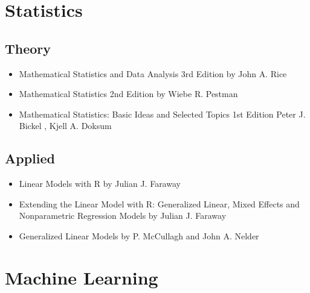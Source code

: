 \documentclass[
  11pt,
]{book}
\providecommand{\tightlist}{%
  \setlength{\itemsep}{0pt}\setlength{\parskip}{0pt}}
\begin{document}
\hypertarget{statistics}{%
\section{Statistics}\label{statistics}}

\hypertarget{theory}{%
\subsection{Theory}\label{theory}}

\begin{itemize}
\tightlist
\item
  Mathematical Statistics and Data Analysis 3rd Edition by John A. Rice
\item
  Mathematical Statistics 2nd Edition by Wiebe R. Pestman
\item
  Mathematical Statistics: Basic Ideas and Selected Topics 1st Edition Peter J. Bickel , Kjell A. Doksum
\end{itemize}

\hypertarget{applied}{%
\subsection{Applied}\label{applied}}

\begin{itemize}
\tightlist
\item
  Linear Models with R by Julian J. Faraway
\item
  Extending the Linear Model with R: Generalized Linear, Mixed Effects and Nonparametric Regression Models by Julian J. Faraway
\item
  Generalized Linear Models by P. McCullagh and John A. Nelder
\end{itemize}

\hypertarget{machine-learning}{%
\section{Machine Learning}\label{machine-learning}}
\end{document}
